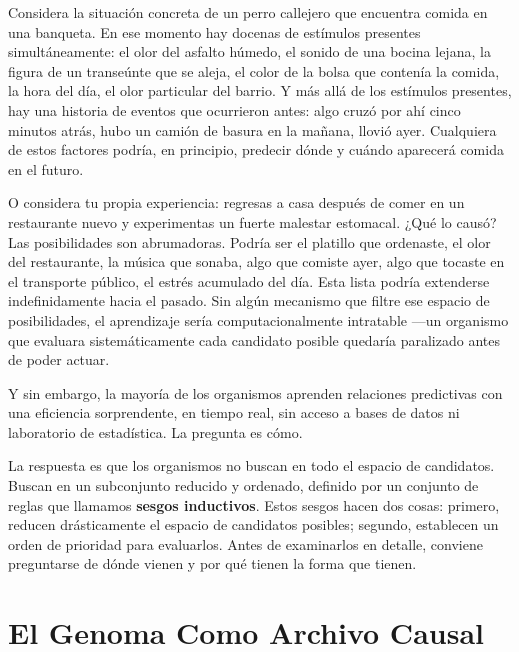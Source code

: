 \documentclass[
  letterpaper,
  DIV=11,
  numbers=noendperiod]{scrreprt}
\begin{document}
\begin{tcolorbox}[enhanced jigsaw, arc=.35mm, bottomrule=.15mm, breakable, colback=white, colframe=quarto-callout-note-color-frame, left=2mm, leftrule=.75mm, opacityback=0, rightrule=.15mm, toprule=.15mm]
Considera la situación concreta de un perro callejero que encuentra
comida en una banqueta. En ese momento hay docenas de estímulos
presentes simultáneamente: el olor del asfalto húmedo, el sonido de una
bocina lejana, la figura de un transeúnte que se aleja, el color de la
bolsa que contenía la comida, la hora del día, el olor particular del
barrio. Y más allá de los estímulos presentes, hay una historia de
eventos que ocurrieron antes: algo cruzó por ahí cinco minutos atrás,
hubo un camión de basura en la mañana, llovió ayer. Cualquiera de estos
factores podría, en principio, predecir dónde y cuándo aparecerá comida
en el futuro.

O considera tu propia experiencia: regresas a casa después de comer en
un restaurante nuevo y experimentas un fuerte malestar estomacal. ¿Qué
lo causó? Las posibilidades son abrumadoras. Podría ser el platillo que
ordenaste, el olor del restaurante, la música que sonaba, algo que
comiste ayer, algo que tocaste en el transporte público, el estrés
acumulado del día. Esta lista podría extenderse indefinidamente hacia el
pasado. Sin algún mecanismo que filtre ese espacio de posibilidades, el
aprendizaje sería computacionalmente intratable ---un organismo que
evaluara sistemáticamente cada candidato posible quedaría paralizado
antes de poder actuar.

Y sin embargo, la mayoría de los organismos aprenden relaciones
predictivas con una eficiencia sorprendente, en tiempo real, sin acceso
a bases de datos ni laboratorio de estadística. La pregunta es cómo.

La respuesta es que los organismos no buscan en todo el espacio de
candidatos. Buscan en un subconjunto reducido y ordenado, definido por
un conjunto de reglas que llamamos \textbf{sesgos inductivos}. Estos
sesgos hacen dos cosas: primero, reducen drásticamente el espacio de
candidatos posibles; segundo, establecen un orden de prioridad para
evaluarlos. Antes de examinarlos en detalle, conviene preguntarse de
dónde vienen y por qué tienen la forma que tienen.

\section{El Genoma Como Archivo
Causal}\label{el-genoma-como-archivo-causal}


\end{tcolorbox}
\end{document}
